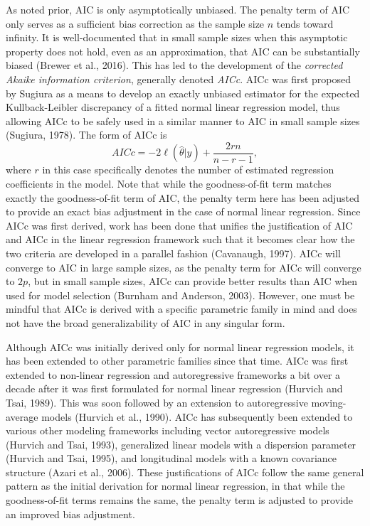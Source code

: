 		As noted prior, AIC is only asymptotically unbiased. The penalty term of AIC only serves as a sufficient bias correction as the sample size $n$ tends toward infinity. It is well-documented that
		in small sample sizes when this asymptotic property does not hold, even as an approximation, that AIC can be substantially biased (Brewer et al., 2016). This has led to the development of the 
		\textit{corrected Akaike information criterion}, generally denoted \textit{AICc}. AICc was first proposed by Sugiura as a means to develop an exactly unbiased estimator for the expected
		Kullback-Leibler discrepancy of a fitted normal linear regression model, thus allowing AICc to be safely used in a similar manner to AIC in small sample sizes (Sugiura, 1978). The form of AICc is 
		\begin{equation*}
			AICc = -2 \ell(\hat{\theta}|y) + \frac{2 r n}{n - r - 1},
		\end{equation*}
		where $r$ in this case specifically denotes the number of estimated regression coefficients in the model. Note that while the goodness-of-fit term matches exactly the goodness-of-fit term
		of AIC, the penalty term here has been adjusted to provide an exact bias adjustment in the case of  normal linear regression. Since AICc was first derived, work has been done that unifies
		the justification of AIC and AICc in the linear regression framework such that it becomes clear how the two criteria are developed in a parallel fashion (Cavanaugh, 1997). AICc will converge
		to AIC in large sample sizes, as the penalty term for AICc will converge to $2p$, but in small sample sizes, AICc can provide better results than AIC when used for model selection
		(Burnham and Anderson, 2003). However, one must be mindful that AICc is derived with a specific parametric family in mind and does not have the broad generalizability of AIC in any singular form.

		Although AICc was initially derived only for normal linear regression models, it has been extended to other parametric families since that time. AICc was first extended to non-linear regression
		and autoregressive frameworks a bit over a decade after it was first formulated for normal linear regression (Hurvich and Tsai, 1989). This was soon followed by an extension to autoregressive
		moving-average models (Hurvich et al., 1990). AICc has subsequently been extended to various other modeling frameworks including vector autoregressive models (Hurvich and Tsai, 1993), generalized
		linear models with a dispersion parameter (Hurvich and Tsai, 1995), and longitudinal models with a known covariance structure (Azari et al., 2006). These justifications of AICc follow the same general
		pattern as the initial derivation for normal linear regression, in that while the goodness-of-fit terms remains the same, the penalty term is adjusted to provide an improved bias adjustment.

